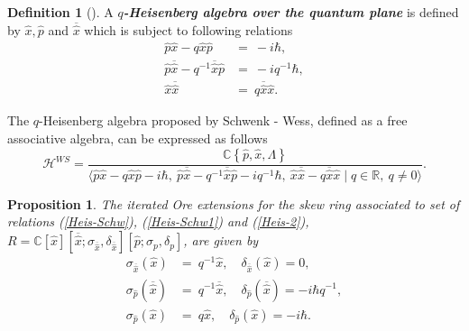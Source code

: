 \documentclass[12pt,a4paper]{article}
\theoremstyle{plain}
\newtheorem{proposition}[theorem]{Proposition}
\theoremstyle{definition}
\newtheorem{definition}[theorem]{Definition}
\theoremstyle{remark}
\begin{document}
\begin{definition}[{\cite[p. 1]{Wess-Schwenk1992}}]\label{Wess-Schwenk1992a}
A \textit{\textbf{$q$-Heisenberg algebra over the quantum plane}} is defined by $\hat{x}, \hat{p}$ and $\overline{\hat{x}}$ which is subject to following relations
\begin{align}\label{Heis-Schw}
    \hat{p}\hat{x}-q\hat{x}\hat{p} & = \ -i\hbar, \\
    \label{Heis-Schw1}\hat{p}\overline{\hat{x}}-q^{-1}\overline{\hat{x}}\hat{p} & = \ -iq^{-1}\hbar ,\\ 
    \label{Heis-Schw2}\hat{x}\overline{\hat{x}} & = \ q\overline{\hat{x}}\hat{x}.
\end{align}
\end{definition}
     The $q$-Heisenberg algebra proposed by Schwenk - Wess, defined as a free associative algebra, can be expressed as follows
\begin{equation*}
        \mathcal{H}^{WS}=\frac{\mathbb{C}\left\{ \hat{p}, \hat{x}, \Lambda \right\} }{ \langle \hat{p}\hat{x} - q\hat{x}\hat{p} - i\hbar, \ \hat{p} \overline{\hat{x}} - q^{-1}\overline{\hat{x}} \hat{p} -iq^{-1}\hbar , \ \hat{x} \overline{\hat{x}} - q \overline{\hat{x}} \hat{x} \mid q\in \mathbb{R}, \ q\neq 0 \rangle}.
    \end{equation*}
\begin{proposition}
 The iterated Ore extensions for the skew ring associated to set of relations \rm(\ref{Heis-Schw}), \rm(\ref{Heis-Schw1}) and \rm(\ref{Heis-2}), $R=\mathbb{C}[\hat{x}][\overline{\hat{x}};\sigma_{\overline{\hat{x}}},\delta_{\overline{\hat{x}}}][\hat{p};\sigma_{p},\delta_{p}]$, are given by
 \begin{align}
    \label{s1}\sigma_{\overline{\hat{x}}}(\hat{x}) & = \ q^{-1}\hat{x}, \quad \delta_{\overline{\hat{x}}}(\hat{x})=0,\\ \label{s2}\sigma_{\hat{p}}(\overline{\hat{x}}) &= \ q^{-1}\overline{\hat{x}},\quad  \delta_{\hat{p}}(\overline{\hat{x}})  = -i\hbar q^{-1},\\
    \label{s3}\sigma_{\hat{p}}(\hat{x}) & = \ q\hat{x}, \quad \delta_{\hat{p}}(\hat{x})=-i\hbar .
 \end{align}
\end{proposition}
\end{document}
